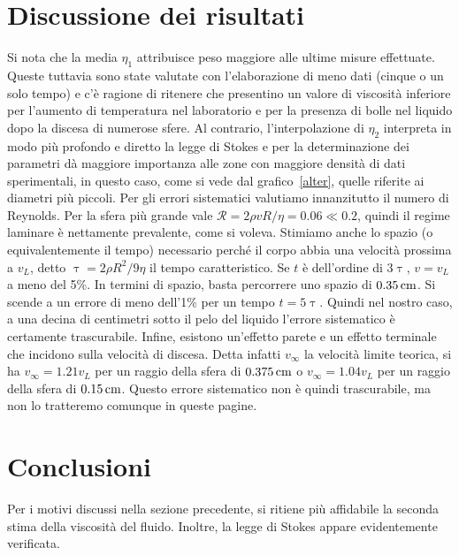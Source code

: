 \documentclass[italian,a4paper]{article}
\renewcommand{\tau}{\uptau} %
\begin{document}
\section{Discussione dei risultati}
Si nota che la media $\eta_1$ attribuisce peso maggiore alle ultime misure effettuate. Queste tuttavia sono state valutate con l'elaborazione di meno dati (cinque o un solo tempo) e c'è ragione di ritenere che presentino un valore di viscosità inferiore per l'aumento di temperatura nel laboratorio e per la presenza di bolle nel liquido dopo la discesa di numerose sfere. Al contrario, l'interpolazione di $\eta_2$ interpreta in modo più profondo e diretto la legge di Stokes e per la determinazione dei parametri dà maggiore importanza alle zone con maggiore densità di dati sperimentali, in questo caso, come si vede dal grafico~\ref{alter}, quelle riferite ai diametri più piccoli. 
Per gli errori sistematici valutiamo innanzitutto il numero di Reynolds. Per la sfera più grande vale $\mathcal{R}=2\rho v R / \eta = 0.06 \ll 0.2$, quindi il regime laminare è nettamente prevalente, come si voleva. Stimiamo anche lo spazio (o equivalentemente il tempo) necessario perché il corpo abbia una velocità prossima a $v_L$, detto $\tau=2\rho R^2 / 9\eta$ il tempo caratteristico.
Se $t$ è dell'ordine di $3\tau$, $v= v_L$ a meno del 5\%. In termini di spazio, basta percorrere uno spazio di $\unit[0.35]{cm}$. Si scende a un errore di meno dell'1\% per un tempo $t=5\tau$. Quindi nel nostro caso, a una decina di centimetri sotto il pelo del liquido l'errore sistematico è certamente trascurabile. Infine, esistono un'effetto parete e un effetto terminale che incidono sulla velocità di discesa. Detta infatti $v_\infty$ la velocità limite teorica, si ha $v_\infty = 1.21 v_L$ per un raggio della sfera di $\unit[0.375]{cm}$ o  $v_\infty = 1.04 v_L$ per un raggio della sfera di $\unit[0.15]{cm}$. Questo errore sistematico non è quindi trascurabile, ma non lo tratteremo comunque in queste pagine.
\section{Conclusioni}
Per i motivi discussi nella sezione precedente, si ritiene più affidabile la seconda stima della viscosità del fluido. Inoltre, la legge di Stokes appare evidentemente verificata.
\end{document}
